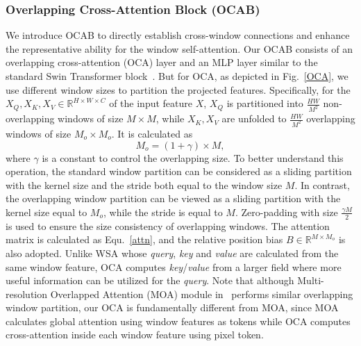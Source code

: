 \documentclass[10pt,twocolumn,letterpaper]{article}
\begin{document}
\subsubsection{Overlapping Cross-Attention Block (OCAB)}
\label{ocab}
We introduce OCAB to directly establish cross-window connections and enhance the representative ability for the window self-attention. Our OCAB consists of an overlapping cross-attention (OCA) layer and an MLP layer similar to the standard Swin Transformer block~\cite{swin_t}.  But for OCA, as depicted in Fig.~\ref{OCA}, we use different window sizes to partition the projected features. Specifically, for the $X_Q,X_K,X_V\in\mathbb{R}^{H\times W\times C}$ of the input feature $X$, $X_Q$ is partitioned into $\frac{HW}{M^2}$ non-overlapping windows of size ${M}\times {M}$, while $X_K,X_V$ are unfolded to $\frac{HW}{M^2}$ overlapping windows of size ${M_o}\times {M_o}$. It is calculated as
\begin{equation}
    M_o=(1+\gamma)\times M,
\end{equation}
where $\gamma$ is a constant to control the overlapping size. To better understand this operation, the standard window partition can be considered as a sliding partition with the kernel size and the stride both equal to the window size $M$. In contrast, the overlapping window partition can be viewed as a sliding partition with the kernel size equal to $ M_o$, while the stride is equal to $M$. Zero-padding with size $\frac{\gamma M}{2}$ is used to ensure the size consistency of overlapping windows. The attention matrix is calculated as Equ.~\ref{attn}, and the relative position bias $B\in\mathbb{R}^{M\times M_o}$ is also adopted. Unlike WSA whose \textit{query}, \textit{key} and \textit{value} are calculated from the same window feature, OCA computes \textit{key}/\textit{value} from a larger field where more useful information can be utilized for the \textit{query}. 
Note that although Multi-resolution Overlapped Attention (MOA) module in~\cite{moa} performs similar overlapping window partition, our OCA is fundamentally different from MOA, since MOA calculates global attention using window features as tokens while OCA computes cross-attention inside each window feature using pixel token. 
\end{document}
